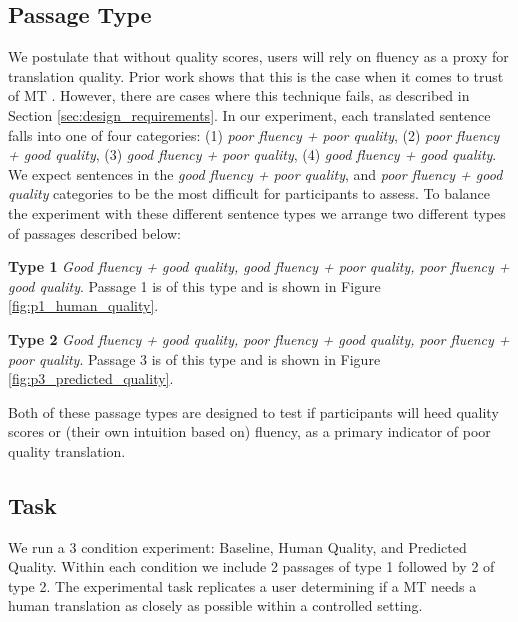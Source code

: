 \subsection{Passage Type}
We postulate that without quality scores, users will rely on fluency as a proxy for translation quality. Prior work shows that this is the case when it comes to trust of MT \cite{martindaleFluency2018}. However, there are cases where this technique fails, as described in Section \ref{sec:design_requirements}.  
In our experiment, each translated sentence falls into one of four categories: (1) \textit{poor fluency + poor quality}, (2) \textit{poor fluency + good quality}, (3) \textit{good fluency + poor quality}, (4) \textit{good fluency + good quality}. We expect sentences in the \textit{good fluency + poor quality}, and \textit{poor fluency + good quality} categories to be the most difficult for participants to assess. To balance the experiment with these different sentence types we arrange two different types of passages described below: 

\begin{compacthang}
    \item \textbf{Type 1} \textit{Good fluency + good quality, good fluency + poor quality, poor fluency + good quality}. Passage 1 is of this type and is shown in Figure \ref{fig:p1_human_quality}.    
    \item \textbf{Type 2} \textit{Good fluency + good quality, poor fluency + good quality, poor fluency + poor quality}. Passage 3 is of this type and is shown in Figure \ref{fig:p3_predicted_quality}.     
\end{compacthang}

Both of these passage types are designed to test if participants will heed quality scores or (their own intuition based on) fluency, as a primary indicator of poor quality translation. 

\subsection{Task} 
We run a 3 condition experiment: Baseline, Human Quality, and Predicted Quality. Within each condition we include 2 passages of type 1 followed by 2 of type 2. The experimental task replicates a user determining if a MT needs a human translation as closely as possible within a controlled setting. 

